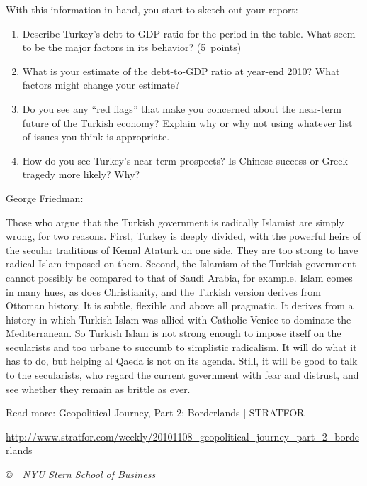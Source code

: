 \documentclass[letterpaper,12pt]{article}
\begin{document}
With this information in hand, you start to sketch out your report:  
\begin{enumerate}
\item Describe Turkey's debt-to-GDP ratio for the period in the table.
What seem to be the major factors in its behavior? 
(5~points) 

\item 
What is your estimate of the debt-to-GDP ratio 
at year-end 2010?  
What factors might change your estimate?  

\item Do you see any ``red flags'' that make you concerned 
about the near-term future of the Turkish economy?  
Explain why or why not using whatever list of issues you think is appropriate. 

\item How do you see Turkey's near-term prospects?
Is Chinese success or Greek tragedy more likely?
Why?  
\end{enumerate}


George Friedman:  

Those who argue that the Turkish government is radically Islamist are simply wrong, for two reasons. First, Turkey is deeply divided, with the powerful heirs of the secular traditions of Kemal Ataturk on one side. They are too strong to have radical Islam imposed on them. Second, the Islamism of the Turkish government cannot possibly be compared to that of Saudi Arabia, for example. Islam comes in many hues, as does Christianity, and the Turkish version derives from Ottoman history. It is subtle, flexible and above all pragmatic. It derives from a history in which Turkish Islam was allied with Catholic Venice to dominate the Mediterranean. So Turkish Islam is not strong enough to impose itself on the secularists and too urbane to succumb to simplistic radicalism. It will do what it has to do, but helping al Qaeda is not on its agenda. Still, it will be good to talk to the secularists, who regard the current government with fear and distrust, and see whether they remain as brittle as ever.

Read more: Geopolitical Journey, Part 2: Borderlands | STRATFOR 

\url{http://www.stratfor.com/weekly/20101108_geopolitical_journey_part_2_borderlands}


\vfill \centerline{\it \copyright \ \number\year \ NYU Stern
School of Business}
\end{document}
